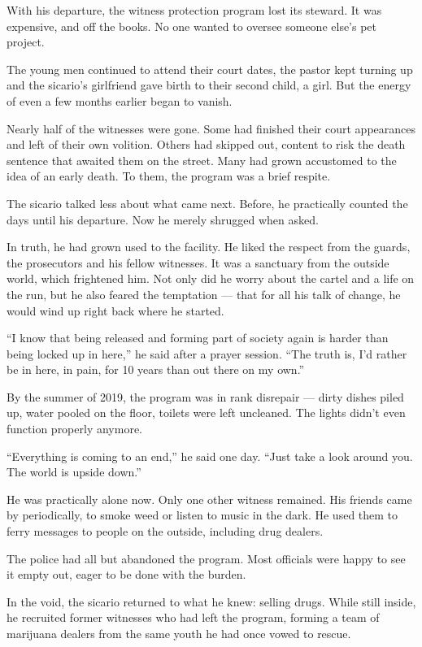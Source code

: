 With his departure, the witness protection program lost its steward. It
was expensive, and off the books. No one wanted to oversee someone
else's pet project.

The young men continued to attend their court dates, the pastor kept
turning up and the sicario's girlfriend gave birth to their second
child, a girl. But the energy of even a few months earlier began to
vanish.

Nearly half of the witnesses were gone. Some had finished their court
appearances and left of their own volition. Others had skipped out,
content to risk the death sentence that awaited them on the street. Many
had grown accustomed to the idea of an early death. To them, the program
was a brief respite.

The sicario talked less about what came next. Before, he practically
counted the days until his departure. Now he merely shrugged when asked.

In truth, he had grown used to the facility. He liked the respect from
the guards, the prosecutors and his fellow witnesses. It was a sanctuary
from the outside world, which frightened him. Not only did he worry
about the cartel and a life on the run, but he also feared the
temptation --- that for all his talk of change, he would wind up right
back where he started.

``I know that being released and forming part of society again is harder
than being locked up in here,'' he said after a prayer session. ``The
truth is, I'd rather be in here, in pain, for 10 years than out there on
my own.''

By the summer of 2019, the program was in rank disrepair --- dirty
dishes piled up, water pooled on the floor, toilets were left uncleaned.
The lights didn't even function properly anymore.

``Everything is coming to an end,'' he said one day. ``Just take a look
around you. The world is upside down.''

He was practically alone now. Only one other witness remained. His
friends came by periodically, to smoke weed or listen to music in the
dark. He used them to ferry messages to people on the outside, including
drug dealers.

The police had all but abandoned the program. Most officials were happy
to see it empty out, eager to be done with the burden.

In the void, the sicario returned to what he knew: selling drugs. While
still inside, he recruited former witnesses who had left the program,
forming a team of marijuana dealers from the same youth he had once
vowed to rescue.

